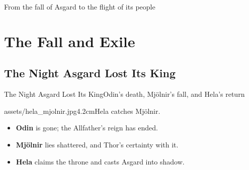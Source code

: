 \newcommand{\lossestitle}{The Night Asgard Lost Its King}
\newcommand{\sakaartitle}{Cast Out by the Bifrost}
\newcommand{\decisionstitle}{The Price of the Road Home}
\newcommand{\prioritiestitle}{Asgard Is Its People}
\newcommand{\returntitle}{The Road Home Ends in Fire}
\newcommand{\modeltitle}{A Tally of the Survivors}

{
    \begin{frame}
        \titlepage
    \end{frame}
}

\begin{frame}{\contentslabel}{From the fall of Asgard to the flight of its people}
    \begin{SlideContents}
    \end{SlideContents}
\end{frame}

\section{The Fall and Exile}
\subsection{\lossestitle}
\begin{frame}{\lossestitle}{Odin's death, Mjölnir's fall, and Hela's return}
    \begin{SlideBulletsPhoto}{assets/hela_mjolnir.jpg}{4.2cm}{Hela catches Mjölnir.}
        \begin{itemize}
            \item \textbf{Odin} is gone; the Allfather's reign has ended.
            \item \textbf{Mjölnir} lies shattered, and Thor's certainty with it.
            \item \textbf{Hela} claims the throne and casts Asgard into shadow.
        \end{itemize}
    \end{SlideBulletsPhoto}
\end{frame}

